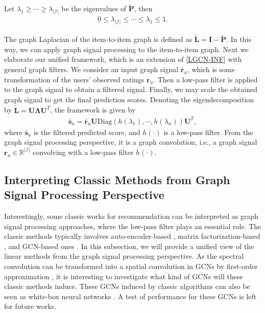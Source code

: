 \documentclass[sigconf]{acmart}
\begin{document}
\begin{theorem} \label{thm:P}
    Let $\lambda_1 \geq \cdots \geq \lambda_{|\mathcal{I}|}$ be the eigenvalues of $\tilde{\bm{P}}$, then
    \begin{align*}
        0 \leq \lambda_{|\mathcal{I}|} \leq \cdots \leq \lambda_1 \leq 1.
    \end{align*}
\end{theorem}
The graph Laplacian of the item-to-item graph is defined as $\tilde{\bm{L}} = \bm{I} - \tilde{\bm{P}}$. In this way, we can apply graph signal processing to the item-to-item graph. Next we elaborate our unified framework, which is an extension of \eqref{LGCN-INF} with general graph filters. We consider an input graph signal $\bar{\bm{r} }_u$, which is some transformation of the users' observed ratings $\bm{r}_u$. Then a low-pass filter is applied to the graph signal to obtain a filtered signal. Finally, we may scale the obtained graph signal to get the final prediction scores. Denoting the eigendecomposition by $\tilde{\bm{L}} = \bm{U}\bm{\Lambda}\bm{U}^T$, the framework is given by 
\begin{align} \label{eq:framework}
    \bar{\bm{s}}_u = \bar{\bm{r}}_u \bm{U} \text{Diag}(h(\lambda_1), \cdots, h(\lambda_n)) \bm{U}^T,
\end{align}
where $\bar{\bm{s}}_u$ is the filtered predicted score, and $h(\cdot)$ is a low-pass filter. From the graph signal processing perspective, it is a graph convolution, i.e., a graph signal $\bm{r}_u \in \mathbb{R}^{|\mathcal{I}|}$ convolving with a low-pass filter $h(\cdot)$.



\subsection{Interpreting Classic Methods from Graph Signal Processing Perspective} \label{sec:related}
Interestingly, some classic works for recommendation can be interpreted as graph signal processing approaches, where the low-pass filter plays an essential role. The classic methods typically involves auto-encoder-based \cite{ning2011slim,liang2018variational,steck2020autoencoders}, matrix factorization-based \cite{rendle2012bpr,chen2021scalable}, and GCN-based ones \cite{wang2019neural,he2020lightgcn,zhang2021cope}. In this subsection, we will provide a unified view of the linear methods from the graph signal processing perspective. As the spectral convolution can be transformed into a spatial convolution in GCNs by first-order approximation \cite{kipf2016semi}, it is interesting to investigate what kind of GCNs will these classic methods induce. These GCNs induced by classic algorithms can also be seen as white-box neural networks \cite{chan2021redunet}. A test of performance for these GCNs is left for future works.
\end{document}
